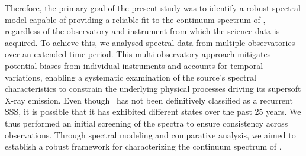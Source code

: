 	Therefore, the primary goal of the present study was to identify a robust spectral model capable of providing a reliable fit to the continuum spectrum of \source, regardless of the observatory and instrument from which the science data is acquired. To achieve this, we analysed spectral data from multiple observatories over an extended time period. This multi-observatory approach mitigates potential biases from individual instruments and accounts for temporal variations, enabling a systematic examination of the source’s spectral characteristics to constrain the underlying physical processes driving its supersoft X-ray emission. Even though \source\ has not been definitively classified as a recurrent SSS, it is possible that it has exhibited different states over the past 25 years. We thus performed an initial screening of the spectra to ensure consistency across observations.
	Through spectral modeling and comparative analysis, we aimed to establish a robust framework for characterizing the continuum spectrum of \source. %
